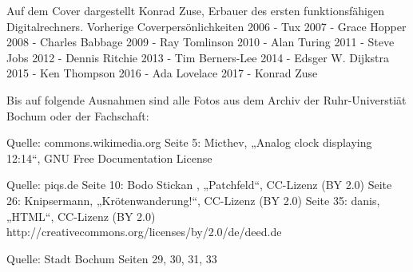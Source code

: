 Auf dem Cover dargestellt
Konrad Zuse, Erbauer des ersten funktionsfähigen Digitalrechners.
Vorherige Coverpersönlichkeiten
2006 - Tux
2007 - Grace Hopper
2008 - Charles Babbage
2009 - Ray Tomlinson
2010 - Alan Turing
2011 - Steve Jobs
2012 - Dennis Ritchie
2013 - Tim Berners-Lee
2014 - Edsger W. Dijkstra
2015 - Ken Thompson
2016 - Ada Lovelace
2017 - Konrad Zuse

Bis auf folgende Ausnahmen sind alle Fotos aus dem Archiv der Ruhr-Universtiät Bochum oder der Fachschaft:

Quelle: commons.wikimedia.org
Seite 5: Micthev, „Analog clock displaying 12:14“, GNU Free Documentation License

Quelle: piqs.de
Seite 10: Bodo Stickan , „Patchfeld“, CC-Lizenz (BY 2.0)
Seite 26: Knipsermann, „Krötenwanderung!“, CC-Lizenz (BY 2.0)
Seite 35: danis, „HTML“, CC-Lizenz (BY 2.0)
http://creativecommons.org/licenses/by/2.0/de/deed.de

Quelle: Stadt Bochum
Seiten 29, 30, 31, 33

